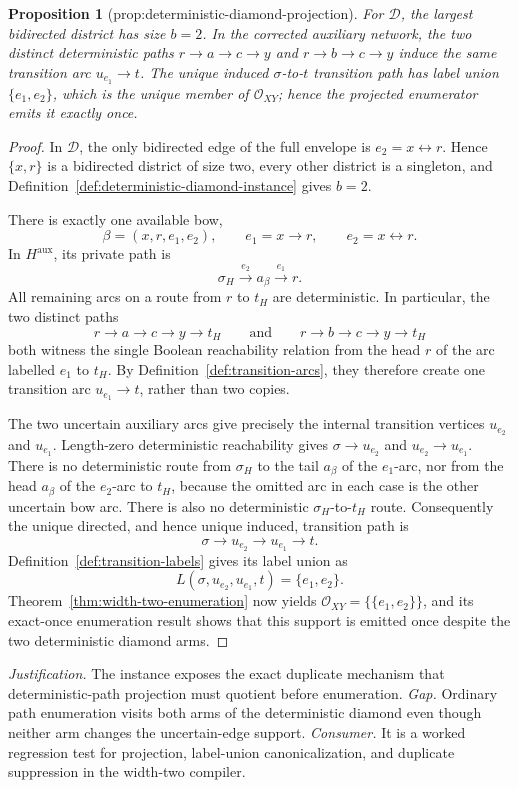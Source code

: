 \documentclass{article}
\newtheorem{proposition}{Proposition}
\begin{document}
\begin{proposition}[prop:deterministic-diamond-projection]\label{prop:deterministic-diamond-projection}
For \(\mathcal D\), the largest bidirected district has size \(b=2\).  In the corrected auxiliary network, the two distinct deterministic paths \(r\to a\to c\to y\) and \(r\to b\to c\to y\) induce the same transition arc \(u_{e_1}\to t\).  The unique induced \(\sigma\)-to-\(t\) transition path has label union \(\{e_1,e_2\}\), which is the unique member of \(\mathcal O_{XY}\); hence the projected enumerator emits it exactly once.
\end{proposition}
\begin{proof}
In \(\mathcal D\), the only bidirected edge of the full envelope is \(e_2=x\leftrightarrow r\).  Hence \(\{x,r\}\) is a bidirected district of size two, every other district is a singleton, and Definition~\ref{def:deterministic-diamond-instance} gives \(b=2\).

There is exactly one available bow,
\[
 \beta=(x,r,e_1,e_2),
 \qquad e_1=x\to r,
 \qquad e_2=x\leftrightarrow r.
\]
In \(H^{\mathrm{aux}}\), its private path is
\[
 \sigma_H\xrightarrow{e_2}a_\beta
 \xrightarrow{e_1}r.
\]
All remaining arcs on a route from \(r\) to \(t_H\) are deterministic.  In particular, the two distinct paths
\[
 r\to a\to c\to y\to t_H
 \qquad\text{and}\qquad
 r\to b\to c\to y\to t_H
\]
both witness the single Boolean reachability relation from the head \(r\) of the arc labelled \(e_1\) to \(t_H\).  By Definition~\ref{def:transition-arcs}, they therefore create one transition arc \(u_{e_1}\to t\), rather than two copies.

The two uncertain auxiliary arcs give precisely the internal transition vertices \(u_{e_2}\) and \(u_{e_1}\).  Length-zero deterministic reachability gives \(\sigma\to u_{e_2}\) and \(u_{e_2}\to u_{e_1}\).  There is no deterministic route from \(\sigma_H\) to the tail \(a_\beta\) of the \(e_1\)-arc, nor from the head \(a_\beta\) of the \(e_2\)-arc to \(t_H\), because the omitted arc in each case is the other uncertain bow arc.  There is also no deterministic \(\sigma_H\)-to-\(t_H\) route.  Consequently the unique directed, and hence unique induced, transition path is
\[
 \sigma\to u_{e_2}\to u_{e_1}\to t.
\]
Definition~\ref{def:transition-labels} gives its label union as
\[
 L(\sigma,u_{e_2},u_{e_1},t)=\{e_1,e_2\}.
\]
Theorem~\ref{thm:width-two-enumeration} now yields
\(\mathcal O_{XY}=\{\{e_1,e_2\}\}\), and its exact-once enumeration result shows that this support is emitted once despite the two deterministic diamond arms.
\end{proof}
\par\smallskip\noindent \textit{Justification.} The instance exposes the exact duplicate mechanism that deterministic-path projection must quotient before enumeration. \textit{Gap.} Ordinary path enumeration visits both arms of the deterministic diamond even though neither arm changes the uncertain-edge support. \textit{Consumer.} It is a worked regression test for projection, label-union canonicalization, and duplicate suppression in the width-two compiler.
\end{document}
